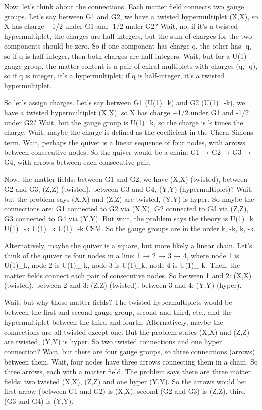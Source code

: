 Now, let's think about the connections. Each matter field connects two gauge groups. Let's say between G1 and G2, we have a twisted hypermultiplet (X,X), so X has charge +1/2 under G1 and -1/2 under G2? Wait, no, if it's a twisted hypermultiplet, the charges are half-integers, but the sum of charges for the two components should be zero. So if one component has charge q, the other has -q, so if q is half-integer, then both charges are half-integers. Wait, but for a U(1) gauge group, the matter content is a pair of chiral multiplets with charges (q, -q), so if q is integer, it's a hypermultiplet; if q is half-integer, it's a twisted hypermultiplet. 

So let's assign charges. Let's say between G1 (U(1)_k) and G2 (U(1)_-k), we have a twisted hypermultiplet (X,X), so X has charge +1/2 under G1 and -1/2 under G2? Wait, but the gauge group is U(1)_k, so the charge is k times the charge. Wait, maybe the charge is defined as the coefficient in the Chern-Simons term. Wait, perhaps the quiver is a linear sequence of four nodes, with arrows between consecutive nodes. So the quiver would be a chain: G1 → G2 → G3 → G4, with arrows between each consecutive pair. 

Now, the matter fields: between G1 and G2, we have (X,X) (twisted), between G2 and G3, (Z,Z) (twisted), between G3 and G4, (Y,Y) (hypermultiplet)? Wait, but the problem says (X,X) and (Z,Z) are twisted, (Y,Y) is hyper. So maybe the connections are: G1 connected to G2 via (X,X), G2 connected to G3 via (Z,Z), G3 connected to G4 via (Y,Y). But wait, the problem says the theory is U(1)_k U(1)_-k U(1)_k U(1)_-k CSM. So the gauge groups are in the order k, -k, k, -k. 

Alternatively, maybe the quiver is a square, but more likely a linear chain. Let's think of the quiver as four nodes in a line: 1 → 2 → 3 → 4, where node 1 is U(1)_k, node 2 is U(1)_-k, node 3 is U(1)_k, node 4 is U(1)_-k. Then, the matter fields connect each pair of consecutive nodes. So between 1 and 2: (X,X) (twisted), between 2 and 3: (Z,Z) (twisted), between 3 and 4: (Y,Y) (hyper). 

Wait, but why those matter fields? The twisted hypermultiplets would be between the first and second gauge group, second and third, etc., and the hypermultiplet between the third and fourth. Alternatively, maybe the connections are all twisted except one. But the problem states (X,X) and (Z,Z) are twisted, (Y,Y) is hyper. So two twisted connections and one hyper connection? Wait, but there are four gauge groups, so three connections (arrows) between them. Wait, four nodes have three arrows connecting them in a chain. So three arrows, each with a matter field. The problem says there are three matter fields: two twisted (X,X), (Z,Z) and one hyper (Y,Y). So the arrows would be: first arrow (between G1 and G2) is (X,X), second (G2 and G3) is (Z,Z), third (G3 and G4) is (Y,Y). 

